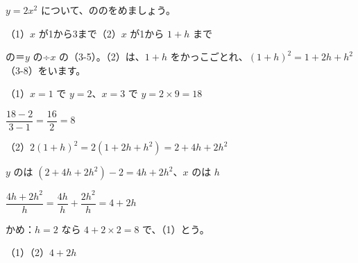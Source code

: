 \begin{reidai}[\R{変化}{へん|か}の\R{割合}{わり|あい}]
$y=2x^2$ について、ののをめましょう。\par（1）\nobreak $x$ が1から3まで\quad（2）\nobreak $x$ が1から $1+h$ まで\par
\kangaekata {}の＝$y$ の÷$x$ の（3-5）。（2）は、$1+h$ をかっこごとれ、$(1+h)^2=1+2h+h^2$（3-8）をいます。\par
\shiki（1）\nobreak $x=1$ で $y=2$、$x=3$ で $y=2\times9=18$\par
\addvspace{4pt}\hspace*{4.3\zw}$\dfrac{18-2}{3-1}=\dfrac{16}{2}=8$\par\vspace{2pt}
\hspace*{2.6\zw}（2）\nobreak $2(1+h)^2=2(1+2h+h^2)=2+4h+2h^2$\par
\hspace*{4.3\zw}$y$ のは $(2+4h+2h^2)-2=4h+2h^2$、$x$ のは $h$\par
\addvspace{4pt}\hspace*{4.3\zw}$\dfrac{4h+2h^2}{h}=\dfrac{4h}{h}+\dfrac{2h^2}{h}=4+2h$\par\vspace{2pt}
\hspace*{4.3\zw}かめ：$h=2$ なら $4+2\times2=8$ で、（1）とう。\par
\kotae（1）\quad（2）\nobreak $4+2h$
\end{reidai}

